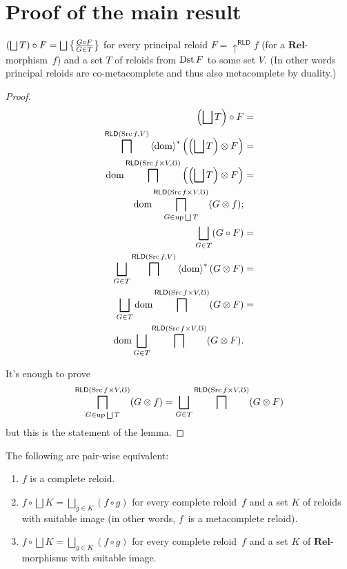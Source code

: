 \section{Proof of the main result}
\begin{lem}
$\left(\bigsqcup T\right)\circ F=\bigsqcup\setcond{G\circ F}{G\in T}$
for every principal reloid $F=\uparrow^{\mathsf{RLD}}f$ (for a $\mathbf{Rel}$-morphism~$f$)
and a set $T$ of reloids from $\operatorname{Dst} F$ to some set $V$. (In other
words principal reloids are co-metacomplete and thus also metacomplete
by duality.)\end{lem}
\begin{proof}
~
\begin{align*}
\left(\bigsqcup T\right)\circ F & =\\
\bigsqcap^{\mathsf{RLD}(\Src f,V)}\rsupfun{\dom}\left(\left(\bigsqcup T\right)\otimes F\right) & =\\
\dom\bigsqcap^{\mathsf{RLD}(\Src f\times V,\mho)}\left(\left(\bigsqcup T\right)\otimes F\right) & =\\
\dom\bigsqcap_{G\in\up\bigsqcup T}^{\mathsf{RLD}(\Src f\times V,\mho)}(G\otimes f);\\
\bigsqcup_{G\in T}(G\circ F) & =\\
\bigsqcup_{G\in T}\bigsqcap^{\mathsf{RLD}(\Src f,V)}\rsupfun{\dom}(G\otimes F) & =\\
\bigsqcup_{G\in T}\dom\bigsqcap^{\mathsf{RLD}(\Src f\times V,\mho)}(G\otimes F) & =\\
\dom\bigsqcup_{G\in T}\bigsqcap^{\mathsf{RLD}(\Src f\times V,\mho)}(G\otimes F).
\end{align*}


It's enough to prove
\[
\bigsqcap_{G\in\up\bigsqcup T}^{\mathsf{RLD}(\Src f\times V,\mho)}(G\otimes f)=\bigsqcup_{G\in T}\bigsqcap^{\mathsf{RLD}(\Src f\times V,\mho)}(G\otimes F)
\]
but this is the statement of the lemma.
\end{proof}

\begin{thm}
The following are pair-wise equivalent:
\begin{enumerate}
\item\label{rld-compl-compl} $f$ is a complete reloid.
\item\label{rld-compl-rld} $f\circ\bigsqcup K=\bigsqcup_{g\in K}(f\circ g)$ for every complete reloid~$f$ and a set $K$ of reloids with suitable image (in other words,
$f$~is a metacomplete reloid).
\item\label{rld-compl-rel} $f\circ\bigsqcup K=\bigsqcup_{g\in K}(f\circ g)$ for every complete reloid~$f$ and a set $K$ of $\mathbf{Rel}$-morphisms with suitable image.
\end{enumerate}
\end{thm}

